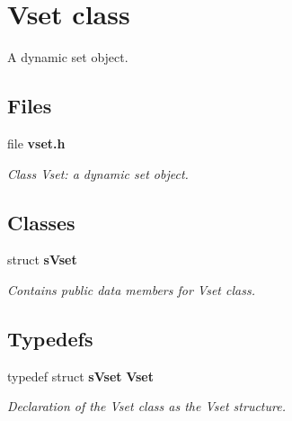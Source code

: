 \section{Vset class}
\label{a00030}


A dynamic set object.  


\subsection*{Files}
\begin{DoxyCompactItemize}
\item 
file {\bf vset.\-h}
\begin{DoxyCompactList}\small\item\em Class Vset\-: a dynamic set object. \end{DoxyCompactList}\end{DoxyCompactItemize}
\subsection*{Classes}
\begin{DoxyCompactItemize}
\item 
struct {\bf s\-Vset}
\begin{DoxyCompactList}\small\item\em Contains public data members for Vset class. \end{DoxyCompactList}\end{DoxyCompactItemize}
\subsection*{Typedefs}
\begin{DoxyCompactItemize}
\item 
typedef struct {\bf s\-Vset} {\bf Vset}
\begin{DoxyCompactList}\small\item\em Declaration of the Vset class as the Vset structure. \end{DoxyCompactList}\end{DoxyCompactItemize}
